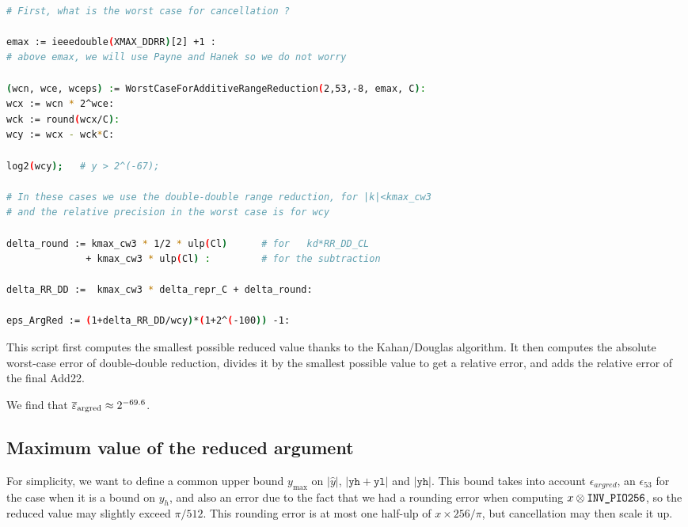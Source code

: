 \begin{lstlisting}[caption={Maple script computing the relative error bound of range reduction}, firstnumber=1,
  language={sh}, numbers=none]% of course it's maple
%Skip a line here, I don't know why, otherwise latex eats the first line

# First, what is the worst case for cancellation ?

emax := ieeedouble(XMAX_DDRR)[2] +1 :
# above emax, we will use Payne and Hanek so we do not worry

(wcn, wce, wceps) := WorstCaseForAdditiveRangeReduction(2,53,-8, emax, C):
wcx := wcn * 2^wce:
wck := round(wcx/C):
wcy := wcx - wck*C:

log2(wcy);   # y > 2^(-67);

# In these cases we use the double-double range reduction, for |k|<kmax_cw3
# and the relative precision in the worst case is for wcy

delta_round := kmax_cw3 * 1/2 * ulp(Cl)      # for   kd*RR_DD_CL
              + kmax_cw3 * ulp(Cl) :         # for the subtraction

delta_RR_DD :=  kmax_cw3 * delta_repr_C + delta_round:

eps_ArgRed := (1+delta_RR_DD/wcy)*(1+2^(-100)) -1:
\end{lstlisting}

This script first computes the smallest possible reduced value thanks
to the Kahan/Douglas algorithm. It then computes the absolute
worst-case error of double-double reduction, divides it by the
smallest possible value to get a relative error, and adds the relative
error of the final Add22.

 We find that
${\overline{\varepsilon}}_{\mathrm{argred}} \approx 2^{-69.6}$.


\subsection{Maximum value of the reduced argument
\label{sec:trigo:maxvalred}}

For simplicity, we want to define a common upper bound $y_{\max}$ on
$|\hat{y}|$, $|\mathtt{yh}+\mathtt{yl}|$ and $|\mathtt{yh}|$. This
bound takes into account $\epsilon_{argred}$, an $\epsilon_{53}$ 
for the case when it is a bound on $y_h$, and also an error due to the
fact that we had a rounding error when computing
$x\otimes\verb!INV_PIO256!$, so the reduced value may slightly exceed
$\pi/512$. This rounding error is at most one half-ulp of $x\times
256/\pi$, but cancellation may then scale it up. 

